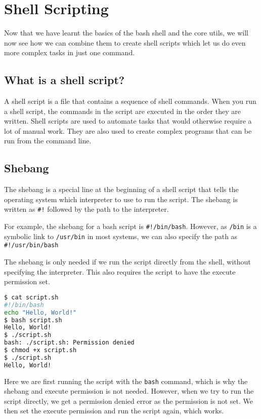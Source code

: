 \chapter{Shell Scripting}

Now that we have learnt the basics of the bash shell and the core utils, we will now see how we can combine them to create shell scripts which let us do even more complex tasks in just one command.

\section{What is a shell script?}

A shell script is a file that contains a sequence of shell commands. When you run a shell script, the commands in the script are executed in the order they are written. Shell scripts are used to automate tasks that would otherwise require a lot of manual work. They are also used to create complex programs that can be run from the command line.

\section{Shebang}

\begin{definition}[Shebang]
    The shebang is a special line at the beginning of a shell script that tells the operating system which interpreter to use to run the script. The shebang is written as \lstinline{#!} followed by the path to the interpreter.
\end{definition}

For example, the shebang for a bash script is \lstinline{#!/bin/bash}.
However, as \lstinline{/bin} is a symbolic link to \lstinline{/usr/bin} in most systems, we can also specify the path as \lstinline{#!/usr/bin/bash}

The shebang is only needed if we run the script directly from the shell, without specifying the interpreter.
This also requires the script to have the execute permission set.


\begin{lstlisting}[language=bash]
$ cat script.sh
#!/bin/bash
echo "Hello, World!"
$ bash script.sh
Hello, World!
$ ./script.sh
bash: ./script.sh: Permission denied
$ chmod +x script.sh
$ ./script.sh
Hello, World!
\end{lstlisting}

Here we are first running the script with the \lstinline{bash} command, which is why the shebang and execute permission is not needed. However, when we try to run the script directly, we get a permission denied error as the permission is not set. We then set the execute permission and run the script again, which works.

